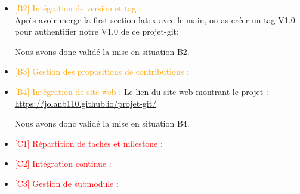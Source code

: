 \begin{itemize}
    \item \textcolor{orange}{[B2] Intégration de version et tag : }
    \\Après avoir merge la first-section-latex avec le main, on as créer un tag V1.0 pour authentifier notre V1.0 de ce projet-git:

    
    

    Nous avons donc validé la mise en situation B2.
    
    \item \textcolor{orange}{[B3] Gestion des propositions de contributions : }
    \item \textcolor{orange}{[B4] Intégration de site web : }
    Le lien du site web montrant le projet : \url{https://jolanb110.github.io/projet-git/}

    Nous avons donc validé la mise en situation B4.
    \item \textcolor{red}{[C1] Répartition de taches et milestone : }
    \item \textcolor{red}{[C2] Intégration continue : }
    \item \textcolor{red}{[C3] Gestion de submodule : }
\end{itemize}